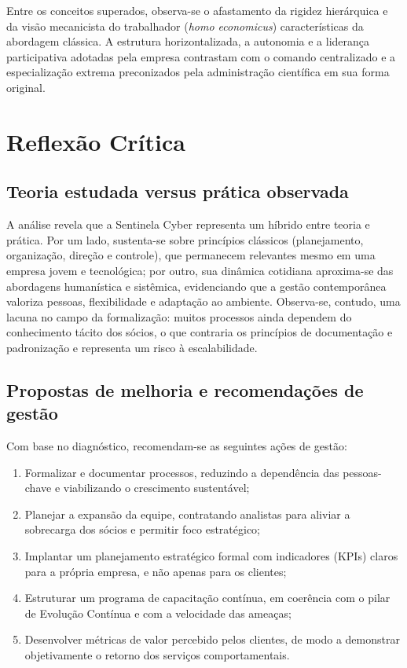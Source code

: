 \documentclass[12pt,a4paper]{article}
\begin{document}
Entre os conceitos superados, observa-se o afastamento da rigidez hierárquica e
da visão mecanicista do trabalhador (\textit{homo economicus}) características da
abordagem clássica. A estrutura horizontalizada, a autonomia e a liderança
participativa adotadas pela empresa contrastam com o comando centralizado e a
especialização extrema preconizados pela administração científica em sua forma
original.

\section{Reflexão Crítica}

\subsection{Teoria estudada versus prática observada}

A análise revela que a Sentinela Cyber representa um híbrido entre teoria e
prática. Por um lado, sustenta-se sobre princípios clássicos (planejamento,
organização, direção e controle), que permanecem relevantes mesmo em uma
empresa jovem e tecnológica; por outro, sua dinâmica cotidiana aproxima-se das
abordagens humanística e sistêmica, evidenciando que a gestão contemporânea
valoriza pessoas, flexibilidade e adaptação ao ambiente. Observa-se, contudo,
uma lacuna no campo da formalização: muitos processos ainda dependem do
conhecimento tácito dos sócios, o que contraria os princípios de documentação e
padronização e representa um risco à escalabilidade.

\subsection{Propostas de melhoria e recomendações de gestão}

Com base no diagnóstico, recomendam-se as seguintes ações de gestão:

\begin{enumerate}[label=\arabic*.]
  \item Formalizar e documentar processos, reduzindo a dependência das
        pessoas-chave e viabilizando o crescimento sustentável;
  \item Planejar a expansão da equipe, contratando analistas para aliviar a
        sobrecarga dos sócios e permitir foco estratégico;
  \item Implantar um planejamento estratégico formal com indicadores (KPIs)
        claros para a própria empresa, e não apenas para os clientes;
  \item Estruturar um programa de capacitação contínua, em coerência com o pilar
        de Evolução Contínua e com a velocidade das ameaças;
  \item Desenvolver métricas de valor percebido pelos clientes, de modo a
        demonstrar objetivamente o retorno dos serviços comportamentais.
\end{enumerate}
\end{document}
